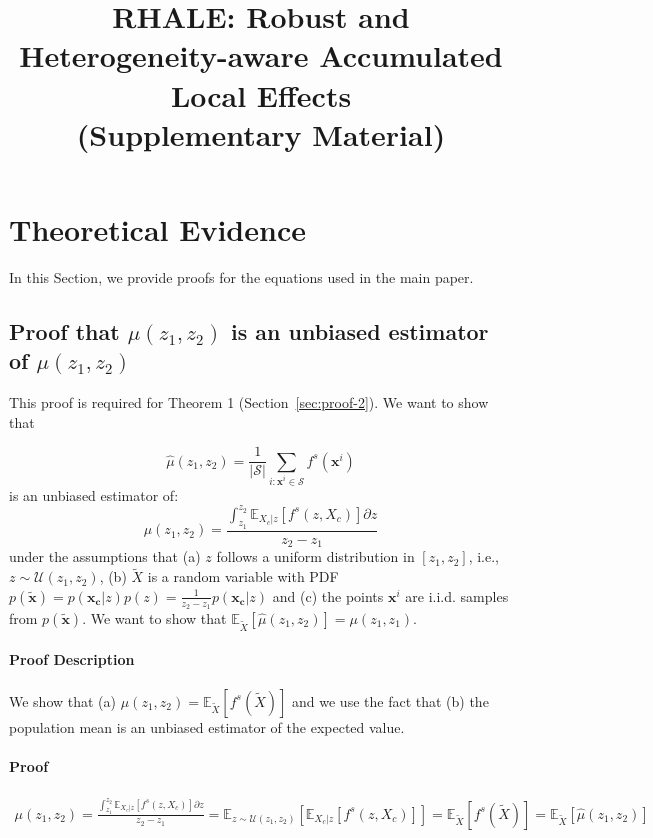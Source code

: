 \documentclass{article} %
\title{RHALE: Robust and Heterogeneity-aware Accumulated Local Effects\\(Supplementary Material)}
\newcommand{\xc}{\mathbf{x_c}}
\newcommand{\xb}{\mathbf{x}}
\begin{document}
\maketitle



\appendix

\section{Theoretical Evidence}

In this Section, we provide proofs for the equations used in the main paper.

\subsection{Proof that \(\hat{\mu}(z_1, z_2)\) is an unbiased estimator of \( \mu(z_1, z_2)\)}
\label{sec:proof-1}

This proof is required for Theorem 1 (Section~\ref{sec:proof-2}).
We want to show that

\[\hat{\mu}(z_1, z_2) = \frac{1}{|\mathcal{S}|} \sum_{i: \mathbf{x}^i
  \in \mathcal{S}} f^s(\mathbf{x}^i) \]
%
is an unbiased estimator of:
%
\[\mu(z_1, z_2) = \frac{\int_{z_1}^{z_2} \mathbb{E}_{X_c|z} \left [
      f^s(z, X_c) \right ] \partial z}{z_2 - z_1} \]
%
under the assumptions that
(a) \(z\) follows a uniform distribution in
\([z_1, z_2]\), i.e., \(z \sim \mathcal{U}(z_1, z_2)\),
(b) \(\tilde{X}\) is a random variable with PDF
\(p(\tilde{\xb}) = p(\xc|z)p(z) = \frac{1}{z_2-z_1}p(\xc|z) \) and
(c) the points \(\mathbf{x}^i\) are i.i.d. samples from
\(p(\tilde{\xb})\).
We want to show that \(\mathbb{E}_{\tilde{X}} [\hat{\mu}(z_1, z_2)] = \mu(z_1, z_1)\).

\paragraph{Proof Description}
We show that (a) \(\mu(z_1, z_2) = \mathbb{E}_{\tilde{X}} [f^s(\tilde{X})]\) and
we use the fact that
(b) the population mean is an unbiased estimator of the expected value.

\paragraph{Proof}
\begin{align}
  \mu(z_1, z_2)
  = \frac{\int_{z_1}^{z_2} \mathbb{E}_{X_c|z} [f^s(z, X_c)] \partial z}{z_2 - z_1}
  = \mathbb{E}_{z \sim \mathcal{U}(z_1, z_2)}[\mathbb{E}_{X_c|z} [f^s(z, X_c)]]
  = \mathbb{E}_{\tilde{X}} [f^s(\tilde{X})]
  = \mathbb{E}_{\tilde{X}} [\hat{\mu}(z_1, z_2)]
\end{align}
\end{document}
